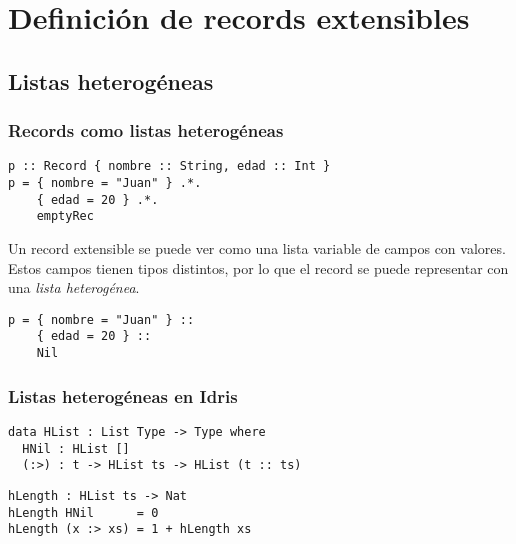 \documentclass{beamer}
\begin{document}
\section{Definición de records extensibles}

\subsection{Listas heterogéneas}

\begin{frame}[fragile]
\frametitle{Records como listas heterogéneas}

\begin{example}
\begin{verbatim}
p :: Record { nombre :: String, edad :: Int }
p = { nombre = "Juan" } .*.
    { edad = 20 } .*.
    emptyRec
\end{verbatim}
\end{example}

\pause

Un record extensible se puede ver como una lista variable de campos con valores. Estos campos tienen tipos distintos, por lo que el record se puede representar con una \textit{lista heterogénea}. 

\pause

\begin{example}
\begin{verbatim}
p = { nombre = "Juan" } ::
    { edad = 20 } ::
    Nil
\end{verbatim}
\end{example}

\end{frame}

\begin{frame}[fragile]
\frametitle{Listas heterogéneas en Idris}

\begin{example}
\begin{verbatim}
data HList : List Type -> Type where
  HNil : HList []
  (:>) : t -> HList ts -> HList (t :: ts)
\end{verbatim}
\end{example}

\pause

\begin{example}
\begin{verbatim}
hLength : HList ts -> Nat
hLength HNil      = 0
hLength (x :> xs) = 1 + hLength xs
\end{verbatim}
\end{example}

\end{frame}
\end{document}
